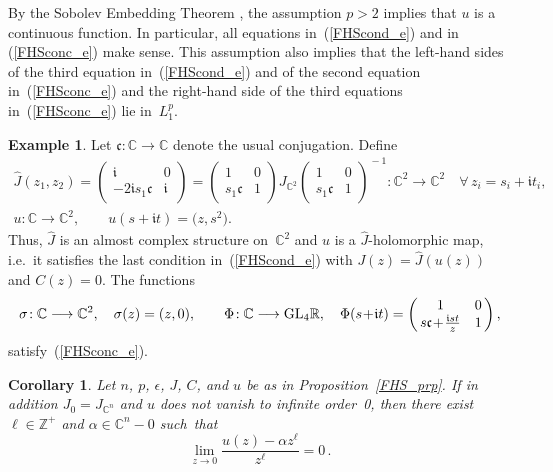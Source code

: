 \documentclass[11pt]{article}
\numberwithin{equation}{section}
\newtheorem{crl}[thm]{Corollary}
\theoremstyle{definition}
\newtheorem{eg}[thm]{Example}
\def\eref#1{(\ref{#1})}
\def\wh#1{\widehat{#1}}
\def\lra{\longrightarrow}
\def\C{\mathbb{C}}
\def\fc{\mathfrak c}
\def\fI{\mathfrak i}
\def\R{\mathbb R}
\def\Z{{\mathbb Z}}
\def\al{\alpha}
\def\ep{\epsilon}
\def\si{\sigma}
\def\GL{\textnormal{GL}}
\begin{document}
\vspace{.2in}

\noindent
By the Sobolev Embedding Theorem \cite[Corollary~4.3]{anal}, 
the assumption $p\!>\!2$ implies that $u$ is a continuous function.
In particular, all equations in~\eref{FHScond_e} and
in \eref{FHSconc_e} make sense.
This assumption also implies that the left-hand sides of the third equation
in~\eref{FHScond_e} and of the second equation in~\eref{FHSconc_e} 
and the right-hand side of the third equations in~\eref{FHSconc_e} 
lie in~$L_1^p$. 

\begin{eg}\label{FHS_eg}
Let $\fc\!:\C\!\lra\!\C$ denote the usual conjugation.
Define
\begin{gather*}
\wh{J}(z_1,z_2)=\left(\!\!\begin{array}{cc} \fI& 0\\ -2\fI s_1\fc& \fI\end{array}\!\!\right)
=\left(\begin{array}{cc} 1& 0\\ s_1\fc& 1\end{array}\!\!\right)
\!\!J_{\C^2}\!\!
\left(\!\!\begin{array}{cc} 1& 0\\ s_1\fc& 1\end{array}\!\!\right)^{\!\!-1}\!:\C^2\lra\C^2
\quad\forall\,z_i\!=\!s_i\!+\!\fI t_i, \\
u\!:\C\lra\C^2, \qquad u(s\!+\!\fI t)=\big(z,s^2).
\end{gather*}
Thus, $\wh{J}$ is an almost complex structure on~$\C^2$ and
$u$ is a $\wh{J}$-holomorphic map, i.e.~it satisfies the last condition
in~\eref{FHScond_e} with $J(z)\!=\!\wh{J}(u(z))$ and $C(z)\!=\!0$.
The functions
$$\si\!:\C\lra\C^2, \quad\si(z)=(z,0), \qquad
\Phi\!:\C\lra\GL_4\R, \quad 
\Phi(s\!+\!\fI t)=
\left(\!\!\begin{array}{cc} 1& 0\\ s\fc\!+\!\frac{\fI st}{z}& 1\end{array}\!\!\right),$$
satisfy~\eref{FHSconc_e}.
\end{eg}


\begin{crl}\label{FHS_crl1}
Let $n$, $p$, $\ep$, $J$, $C$, and $u$ be as in Proposition~\ref{FHS_prp}.
If in addition $J_0\!=\!J_{\C^n}$ and $u$ does not vanish to infinite order~0,
then there exist $\ell\!\in\!\Z^+$ and $\al\!\in\!\C^n\!-\!0$ such~that
$$\lim_{z\lra0}\frac{u(z)-\al z^{\ell}}{z^{\ell}}=0\,.$$  
\end{crl}
\end{document}
